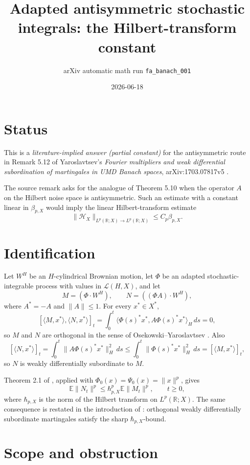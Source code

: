 \documentclass[11pt]{article}
\title{Adapted antisymmetric stochastic integrals: the Hilbert-transform constant}
\author{arXiv automatic math run \texttt{fa\_banach\_001}}
\date{2026-06-18}
\newcommand{\E}{\mathbb E}
\newcommand{\cH}{\mathcal H}
\newcommand{\hbarp}{\hbar_{p,X}}
\newcommand{\betap}{\beta_{p,X}}
\begin{document}
\maketitle

\section*{Status}

This is a \emph{literature-implied answer (partial constant)} for the
antisymmetric route in Remark 5.12 of Yaroslavtsev's
\emph{Fourier multipliers and weak differential subordination of martingales in
UMD Banach spaces}, arXiv:1703.07817v5 \cite{Y17}.

The source remark asks for the analogue of Theorem 5.10 when the operator
\(A\) on the Hilbert noise space is antisymmetric.  Such an estimate with a
constant linear in \(\betap\) would imply the linear Hilbert-transform estimate
\[
\|\cH_X\|_{L^p(\mathbb R;X)\to L^p(\mathbb R;X)}
\le C_p\betap .
\]

\section*{Identification}

Let \(W^H\) be an \(H\)-cylindrical Brownian motion, let \(\Phi\) be an adapted
stochastic-integrable process with values in \(\mathcal L(H,X)\), and let
\[
 M=(\Phi\cdot W^H), \qquad N=((\Phi A)\cdot W^H),
\]
where \(A^*=-A\) and \(\|A\|\le 1\).  For every \(x^*\in X^*\),
\[
[\langle M,x^*\rangle,\langle N,x^*\rangle]_t
=\int_0^t\langle \Phi(s)^*x^*,A\Phi(s)^*x^*\rangle_H\,ds=0,
\]
so \(M\) and \(N\) are orthogonal in the sense of
Osekowski--Yaroslavtsev \cite{OY18}.  Also
\[
[\langle N,x^*\rangle]_t
=\int_0^t\|A\Phi(s)^*x^*\|_H^2\,ds
\le \int_0^t\|\Phi(s)^*x^*\|_H^2\,ds
=[\langle M,x^*\rangle]_t,
\]
so \(N\) is weakly differentially subordinate to \(M\).

Theorem 2.1 of \cite{OY18}, applied with
\(\Phi_0(x)=\Psi_0(x)=\|x\|^p\), gives
\[
\E\|N_t\|^p\le \hbarp^p \E\|M_t\|^p,\qquad t\ge 0,
\]
where \(\hbarp\) is the norm of the Hilbert transform on
\(L^p(\mathbb R;X)\).  The same consequence is restated in the introduction of
\cite{Y18SO}: orthogonal weakly differentially subordinate martingales satisfy
the sharp \(\hbarp\)-bound.

\section*{Scope and obstruction}
\end{document}
